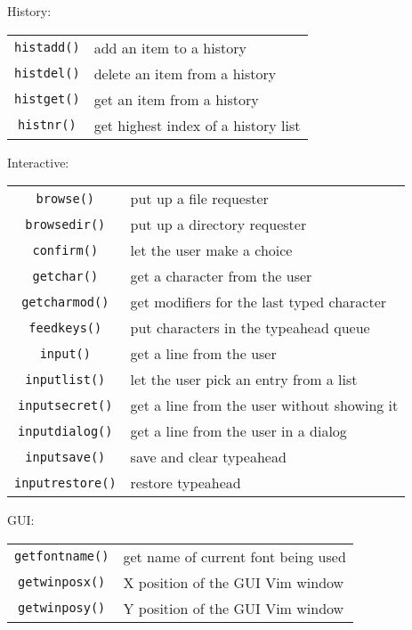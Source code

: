 History:
\label{history-functions}
\begin{center} \begin{tabular}{c l}
				\verb!histadd()! & add an item to a history \\
				\verb!histdel()! & delete an item from a history \\
				\verb!histget()! & get an item from a history \\
				\verb!histnr()! & get highest index of a history list \\
\end{tabular} \end{center}

Interactive:
\label{interactive-functions}
\begin{center} \begin{tabular}{c l}
				\verb!browse()! & put up a file requester \\
				\verb!browsedir()! & put up a directory requester \\
				\verb!confirm()! & let the user make a choice \\
				\verb!getchar()! & get a character from the user \\
				\verb!getcharmod()! & get modifiers for the last typed character \\
				\verb!feedkeys()! & put characters in the typeahead queue \\
				\verb!input()! & get a line from the user \\
				\verb!inputlist()! & let the user pick an entry from a list \\
				\verb!inputsecret()! & get a line from the user without showing it \\
				\verb!inputdialog()! & get a line from the user in a dialog \\
				\verb!inputsave()! & save and clear typeahead \\
				\verb!inputrestore()! & restore typeahead \\
\end{tabular} \end{center}

GUI:
\label{gui-functions}
\begin{center} \begin{tabular}{c l}
				\verb!getfontname()! & get name of current font being used \\
				\verb!getwinposx()! & X position of the GUI Vim window \\
				\verb!getwinposy()! & Y position of the GUI Vim window \\
\end{tabular} \end{center}

